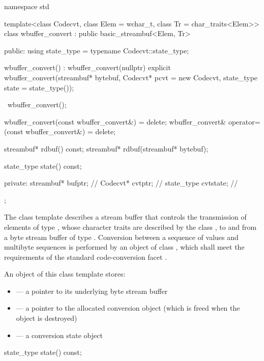 %
\begin{codeblock}
namespace std {
  template<class Codecvt, class Elem = wchar_t, class Tr = char_traits<Elem>>
    class wbuffer_convert : public basic_streambuf<Elem, Tr> {
    public:
      using state_type = typename Codecvt::state_type;

      wbuffer_convert() : wbuffer_convert(nullptr) {}
      explicit wbuffer_convert(streambuf* bytebuf,
                               Codecvt* pcvt = new Codecvt,
                               state_type state = state_type());

      ~wbuffer_convert();

      wbuffer_convert(const wbuffer_convert&) = delete;
      wbuffer_convert& operator=(const wbuffer_convert&) = delete;

      streambuf* rdbuf() const;
      streambuf* rdbuf(streambuf* bytebuf);

      state_type state() const;

    private:
      streambuf* bufptr;            // \expos
      Codecvt* cvtptr;              // \expos
      state_type cvtstate;          // \expos
  };
}
\end{codeblock}

\pnum
The class template describes a stream buffer that controls the
transmission of elements of type , whose character traits are
described by the class , to and from a byte stream buffer of type
. Conversion between a sequence of  values and
multibyte sequences is performed by an object of class
, which shall meet the requirements
of the standard code-conversion facet .

\pnum
An object of this class template stores:

\begin{itemize}
\item {} --- a pointer to its underlying byte stream buffer
\item {} --- a pointer to the allocated conversion object
(which is freed when the  object is destroyed)
\item {} --- a conversion state object
\end{itemize}

%
\begin{itemdecl}
state_type state() const;
\end{itemdecl}

